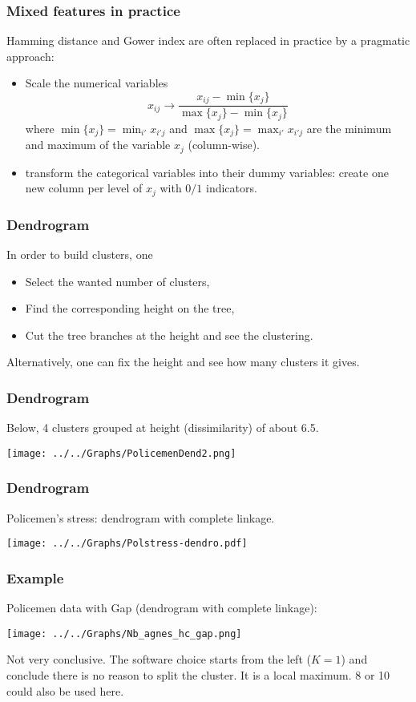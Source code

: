 \begin{frame}
\frametitle{Mixed features in practice}
Hamming distance and Gower index are often replaced in practice by a pragmatic approach:
\begin{itemize}
\item Scale the numerical variables
$$
x_{ij} \rightarrow \frac{x_{ij} - \min\{x_{j}\}}{\max\{x_j\} - \min\{x_j\}}
$$ 
where $\min\{x_j\}=\min_{i'} x_{i'j}$ and $\max\{x_j\}=\max_{i'} x_{i'j}$ are the minimum and maximum of the variable $x_j$ (column-wise).
\item transform the categorical variables into their dummy variables: create one new column per level of $x_j$ with $0/1$ indicators. 
\end{itemize} 
\end{frame}
\begin{frame}
\frametitle{Dendrogram}
In order to build clusters, one 
\begin{itemize}
\item Select the wanted number of clusters,
\item Find the corresponding height on the tree,
\item Cut the tree branches at the height and see the clustering.
\end{itemize}
Alternatively, one can fix the height and see how many clusters it gives.
\end{frame}
\begin{frame}
\frametitle{Dendrogram}
Below, 4 clusters grouped at height (dissimilarity) of about 6.5.
\begin{center}
\texttt{[image: ../../Graphs/PolicemenDend2.png]}
\end{center}
\end{frame}
\begin{frame}
\frametitle{Dendrogram}
Policemen's stress: dendrogram with complete linkage.
\begin{center}
\texttt{[image: ../../Graphs/Polstress-dendro.pdf]}
\end{center}
\end{frame}
\begin{frame}
\frametitle{Example}
Policemen data with Gap (dendrogram with complete linkage):
\begin{center}
\texttt{[image: ../../Graphs/Nb\_agnes\_hc\_gap.png]}
\end{center}
Not very conclusive. The software choice starts from the left ($K=1$) and conclude there is no reason to split the cluster. It is a local maximum. 8 or 10 could also be used here. 
\end{frame}
